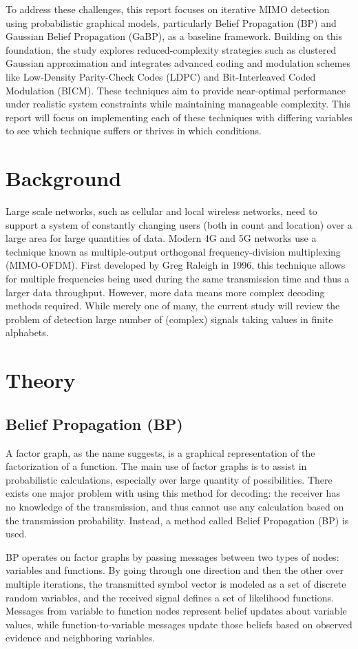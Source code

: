 \documentclass[conference]{IEEEtran}
\begin{document}
To address these challenges, this report focuses on iterative MIMO detection using probabilistic graphical models, particularly Belief Propagation (BP) and Gaussian Belief Propagation (GaBP), as a baseline framework. Building on this foundation, the study explores reduced-complexity strategies such as clustered Gaussian approximation and integrates advanced coding and modulation schemes like Low-Density Parity-Check Codes (LDPC) and Bit-Interleaved Coded Modulation (BICM). These techniques aim to provide near-optimal performance under realistic system constraints while maintaining manageable complexity. This report will focus on implementing each of these techniques with differing variables to see which technique suffers or thrives in which conditions.

\section{Background}
Large scale networks, such as cellular and local wireless networks, need to support a system of constantly changing users (both in count and location) over a large area for large quantities of data. Modern 4G and 5G networks use a technique known as multiple-output orthogonal frequency-division multiplexing (MIMO-OFDM). First developed by Greg Raleigh in 1996, this technique allows for multiple frequencies being used during the same transmission time and thus a larger data throughput. However, more data means more complex decoding methods required. While merely one of many, the current study will review the problem of detection large number of (complex) signals taking values in finite alphabets.

\section{Theory}
\subsection{Belief Propagation (BP)}
A factor graph, as the name suggests, is a graphical representation of the factorization of a function. The main use of factor graphs is to assist in probabilistic calculations, especially over large quantity of possibilities. There exists one major problem with using this method for decoding: the receiver has no knowledge of the transmission, and thus cannot use any calculation based on the transmission probability. Instead, a method called Belief Propagation (BP) is used.\par
BP operates on factor graphs by passing messages between two types of nodes: variables and functions. By going through one direction and then the other over multiple iterations, the transmitted symbol vector is modeled as a set of discrete random variables, and the received signal defines a set of likelihood functions. Messages from variable to function nodes represent belief updates about variable values, while function-to-variable messages update those beliefs based on observed evidence and neighboring variables.
\end{document}
